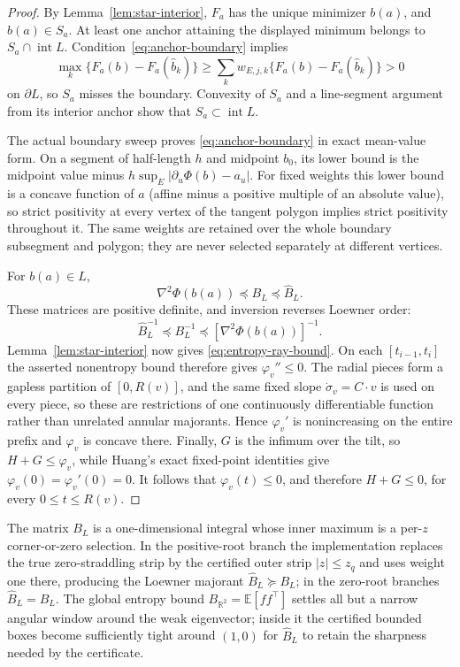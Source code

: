 \documentclass[11pt]{article}
\newcommand{\R}{\mathbb{R}}
\newcommand{\E}{\mathbb{E}}
\begin{document}
\begin{proof}
By Lemma~\ref{lem:star-interior}, $F_a$ has the unique minimizer $b(a)$, and
$b(a)\in S_a$.  At least one anchor attaining the displayed minimum belongs
to $S_a\cap\operatorname{int}L$.  Condition~\eqref{eq:anchor-boundary}
implies
\[
 \max_k\{F_a(b)-F_a(\widehat b_k)\}
 \ge\sum_kw_{E,j,k}\{F_a(b)-F_a(\widehat b_k)\}>0
\]
on $\partial L$, so $S_a$ misses the boundary.  Convexity of $S_a$ and a
line-segment argument from its interior anchor show that $S_a\subset
\operatorname{int}L$.

The actual boundary sweep proves \eqref{eq:anchor-boundary} in exact
mean-value form.  On a segment of half-length $h$ and midpoint $b_0$, its
lower bound is the midpoint value minus
$h\sup_E|\partial_u\Phi(b)-a_u|$.  For fixed weights this lower bound is a
concave function of $a$ (affine minus a positive multiple of an absolute
value), so strict positivity at every vertex of the tangent polygon implies
strict positivity throughout it.  The same weights are retained over the
whole boundary subsegment and polygon; they are never selected separately at
different vertices.

For $b(a)\in L$,
\[
 \nabla^2\Phi(b(a))\preceq B_L\preceq\widehat B_L.
\]
These matrices are positive definite, and inversion reverses Loewner order:
\[
 \widehat B_L^{-1}\preceq B_L^{-1}
 \preceq[\nabla^2\Phi(b(a))]^{-1}.
\]
Lemma~\ref{lem:star-interior} now gives \eqref{eq:entropy-ray-bound}.  On
each $[t_{i-1},t_i]$ the asserted nonentropy bound therefore gives
$\varphi_v''\le0$.  The radial pieces form a gapless partition of
$[0,R(v)]$, and the same fixed slope $\dot\sigma_v=C\cdot v$ is used on
every piece, so these are restrictions of one continuously differentiable
function rather than unrelated annular majorants.  Hence $\varphi_v'$ is
nonincreasing on the entire prefix and $\varphi_v$ is concave there.
Finally, $G$ is the infimum over the tilt, so $H+G\le\varphi_v$, while
Huang's exact fixed-point identities give
$\varphi_v(0)=\varphi_v'(0)=0$.  It follows that
$\varphi_v(t)\le0$, and therefore $H+G\le0$, for every
$0\le t\le R(v)$.
\end{proof}

The matrix $B_L$ is a one-dimensional integral whose inner maximum is a
per-$z$ corner-or-zero selection. In the positive-root branch the implementation
replaces the true zero-straddling strip by the certified outer strip
$|z|\le z_q$ and uses weight one there, producing the Loewner majorant
$\widehat B_L\succeq B_L$;
in the zero-root branches $\widehat B_L=B_L$. The global entropy bound
$B_{\R^2}=\E[ff^\top]$ settles all but a narrow angular window around the weak
eigenvector; inside it the certified bounded boxes become sufficiently tight
around $(1,0)$ for $\widehat B_L$ to retain the sharpness needed by the certificate.
\end{document}
